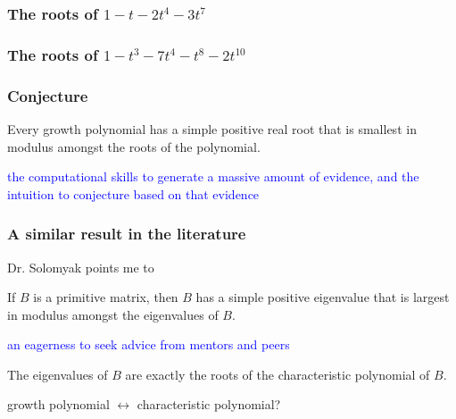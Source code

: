 \documentclass{beamer}
\begin{document}
\begin{frame}
\frametitle{The roots of $1-t-2t^4-3t^7$}

\begin{figure}[h]
\centering
\makebox[\textwidth][c]{\texttt{[image: 1002003]}}
\end{figure}


\end{frame}

\begin{frame}
\frametitle{The roots of $1-t^3-7t^4-t^8-2t^{10}$}

\begin{figure}[h]
\centering
\makebox[\textwidth][c]{\texttt{[image: 0017000102]}}
\end{figure}


\end{frame}




\begin{frame}
\frametitle{Conjecture}

Every growth polynomial has a simple positive real root that is smallest in modulus amongst the roots of the polynomial.

\pause

\hfil

\textcolor{blue}{
the computational skills to generate a massive amount of evidence, and the 
intuition to conjecture based on that evidence
}


\end{frame}


\begin{frame}
\frametitle{A similar result in the literature}

Dr. Solomyak points me to

\begin{thm}
If $B$ is a primitive matrix, then $B$ has a simple positive eigenvalue that is largest in modulus amongst the eigenvalues of $B$.  
\end{thm}

\pause


\hfil

\textcolor{blue}{an eagerness to seek advice from mentors and peers}

\pause

\hfil

The eigenvalues of $B$ are exactly the roots of the characteristic polynomial of $B$.

\pause

\hfil

growth polynomial $\leftrightarrow$ characteristic polynomial?

\end{frame}
\end{document}

